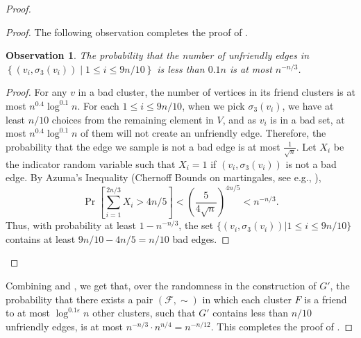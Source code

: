 \documentclass[11pt]{article}
\newtheorem{observation}[theorem]{Observation}
\theoremstyle{definition}
\newcommand{\set}[1]{\left\{ #1 \right\}}
\newcommand{\fset}{{\mathcal{F}}}
\newcommand{\eps}{{\varepsilon}}
\begin{document}
\begin{titlepage}
\begin{proof}
\begin{proof}
The following observation completes the proof of .

\begin{observation}
The probability that the number of unfriendly edges in $\set{(v_i,\sigma_3(v_i))\mid 1\le i\le 9n/10}$ is less than $0.1n$ is at most $n^{-n/3}$.
\end{observation}
\begin{proof}
For any $v$ in a bad cluster, the number of vertices in its friend clusters is at most $n^{0.4} \log^{0.1} n$. 
    For each $1\le i\le 9n/10$, when we pick $\sigma_3(v_i)$, we have at least $n/10$ choices from the remaining element in $V$, and as $v_i$ is in a bad set, at most $n^{0.4} \log^{0.1} n$ of them will not create an unfriendly edge. Therefore, the probability that the edge we sample is not a bad edge is at most $\frac{1}{\sqrt{n}}$. Let $X_i$ be the indicator random variable such that $X_i = 1$ if $(v_i,\sigma_3(v_i))$ is not a bad edge. By Azuma's Inequality (Chernoff Bounds on martingales, see e.g., \cite{kuszmaul2021multiplicative}), 
    $$
        \Pr \left[ \sum_{i=1}^{2n/3} X_i > 4n/5 \right] < \left( \frac{5}{4\sqrt{n}} \right)^{4n/5} < n^{-n/3}.
    $$
    Thus, with probability at least $1-n^{-n/3}$, the set $\{(v_i,\sigma_3(v_i)) | 1 \le i \le 9n/10\}$ contains at least $9n/10-4n/5 = n/10$ bad edges.
\end{proof}
\end{proof}

Combining  and , we get that, over the randomness in the construction of $G'$, the probability that there exists a pair $(\fset,\sim)$ in which each cluster $F$ is a friend to at most $\log^{0.1\eps} n$ other clusters, such that $G'$ contains less than $n/10$ unfriendly edges, is at most $n^{-n/3}\cdot n^{n/4}=n^{-n/12}$.
This completes the proof of .
\end{proof}


\end{titlepage}
\end{document}
